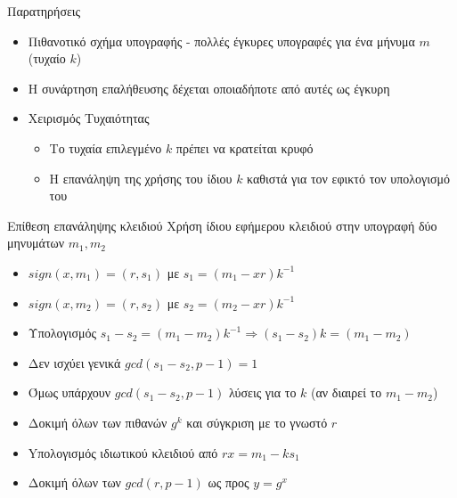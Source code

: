 \documentclass{beamer}
\begin{document}
\begin{frame}{Παρατηρήσεις}
\begin{itemize}
\item Πιθανοτικό σχήμα υπογραφής - πολλές έγκυρες υπογραφές για ένα μήνυμα $m$ (τυχαίο $k$)
\pause
\item Η συνάρτηση επαλήθευσης δέχεται οποιαδήποτε από αυτές ως έγκυρη
\pause
\item Χειρισμός Τυχαιότητας
\begin{itemize}
\item Το τυχαία επιλεγμένο $k$ πρέπει να κρατείται κρυφό
\item H επανάληψη της χρήσης του ίδιου $k$ καθιστά για τον \adv εφικτό τον υπολογισμό του  
\end{itemize}
\end{itemize}
\end{frame}

\begin{frame}{Επίθεση επανάληψης κλειδιού}
Χρήση ίδιου εφήμερου κλειδιού στην υπογραφή δύο μηνυμάτων $m_1,m_2$
\begin{itemize}
    \item $sign(x,m_1) = (r,s_1)$ με $s_1 = (m_1 - x r) k^{-1} $ \pause 
    \item $sign(x,m_2) = (r,s_2)$ με $s_2 = (m_2 - x r) k^{-1} $ \pause
    \item Υπολογισμός $s_1 - s_2 = (m_1 - m_2) k^{-1} \Rightarrow (s_1-s_2)k = (m_1-m_2)$ \pause 
    \item Δεν ισχύει γενικά $gcd(s_1 - s_2, p-1) = 1$ \pause
    \item Όμως υπάρχουν $gcd(s_1 - s_2,p-1)$ λύσεις για το $k$ (αν διαιρεί το $m_1 - m_2$)
    \item Δοκιμή όλων των πιθανών $g^k$ και σύγκριση με το γνωστό $r$ \pause
    \item Yπολογισμός ιδιωτικού κλειδιού από $rx = m_1 - ks_1$ \pause
    \item Δοκιμή όλων των $gcd(r,p-1)$ ως προς $y=g^x$ 
\end{itemize}
\end{frame}
\end{document}
